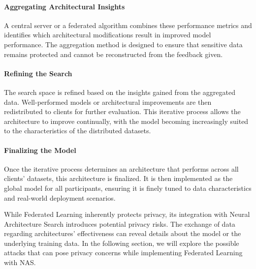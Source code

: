 \documentclass[conference]{IEEEtran}
\begin{document}
\paragraph{Aggregating Architectural Insights}
A central server or a federated algorithm combines these performance metrics and identifies which architectural modifications result in improved model performance. The aggregation method is designed to ensure that sensitive data remains protected and cannot be reconstructed from the feedback given.

\paragraph{Refining the Search}
The search space is refined based on the insights gained from the aggregated data. Well-performed models or architectural improvements are then redistributed to clients for further evaluation. This iterative process allows the architecture to improve continually, with the model becoming increasingly suited to the characteristics of the distributed datasets.

\paragraph{Finalizing the Model}
Once the iterative process determines an architecture that performs across all clients' datasets, this architecture is finalized. It is then implemented as the global model for all participants, ensuring it is finely tuned to data characteristics and real-world deployment scenarios.

While Federated Learning inherently protects privacy, its integration with Neural Architecture Search introduces potential privacy risks. The exchange of data regarding architectures' effectiveness can reveal details about the model or the underlying training data. In the following section, we will explore the possible attacks that can pose privacy concerns while implementing Federated Learning with NAS.
\end{document}
